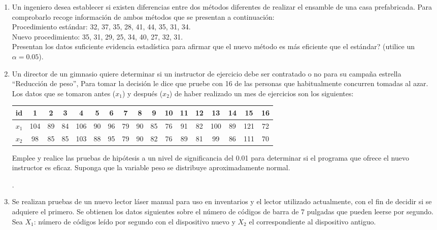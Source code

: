 \documentclass[base=hide,9pt]{elegantbook}
\begin{document}
\begin{enumerate}
	\item Un ingeniero desea establecer si existen diferencias entre dos métodos diferentes de realizar el ensamble de una casa prefabricada. Para comprobarlo recoge información de ambos métodos que se presentan a continuación: \\
	
	Procedimiento estándar: 32, 37, 35, 28, 41, 44, 35, 31, 34. \\
	Nuevo procedimiento: 35, 31, 29, 25, 34, 40, 27, 32, 31. \\
	
	Presentan los datos suficiente evidencia estadística para afirmar que el nuevo método es más eficiente que el estándar? (utilice un $\alpha=0.05$).
	\vspace{.5cm}
	
	\item Un director de un gimnasio quiere determinar si un instructor de ejercicio debe ser contratado o no para su campaña estrella “Reducción de peso”, Para tomar la decisión le dice que pruebe con 16 de las personas que habitualmente concurren tomadas al azar. Los datos que se tomaron antes ($x_{1}$) y después ($x_{2}$) de haber realizado un mes de ejercicios son los siguientes:\\
	
	\begin{tabular}{l|cccccccccccccccc}
		
		id      & 1    &  2   &  3   & 4     & 5    & 6  & 7    & 8  & 9  & 10   & 11   & 12   & 13    & 14   & 15  & 16  \\
		\hline 
		$x_{1}$ & 104  & 89   & 84   & 106   & 90   & 96 & 79   & 90 & 85 & 76   & 91   & 82   & 100   & 89   & 121 & 72  \\
		\hline 
		$x_{2}$ & 98   & 85   & 85   & 103   & 88   & 95 & 79   & 90 & 82 & 76   & 89   & 81   &  99   & 86   & 111 & 70  \\
		
	\end{tabular}
	
	\vspace{.5cm}
	Emplee y realice las pruebas de hipótesis a un nivel de significancia del 0.01 para determinar si el programa que ofrece el nuevo instructor es eficaz. Suponga que la variable peso se distribuye aproximadamente normal.
	
	\newpage 
	.
	\vspace{1cm}
	\item Se realizan pruebas de un nuevo lector láser manual para uso en inventarios y el lector utilizado actualmente, con el fin de decidir si se adquiere el primero. Se obtienen los datos siguientes sobre el número de códigos de barra de 7 pulgadas que pueden leerse por segundo. Sea $X_{1}$: número de códigos leído por segundo con el dispositivo nuevo y $X_{2}$ el correspondiente al dispositivo antiguo.\\
	

\end{enumerate}
\end{document}
